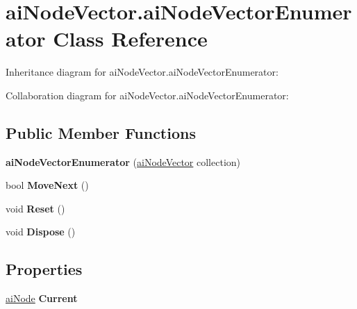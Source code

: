 \hypertarget{classai_node_vector_1_1ai_node_vector_enumerator}{\section{ai\+Node\+Vector.\+ai\+Node\+Vector\+Enumerator Class Reference}
\label{classai_node_vector_1_1ai_node_vector_enumerator}
}


Inheritance diagram for ai\+Node\+Vector.\+ai\+Node\+Vector\+Enumerator\+:


Collaboration diagram for ai\+Node\+Vector.\+ai\+Node\+Vector\+Enumerator\+:
\subsection*{Public Member Functions}
\begin{DoxyCompactItemize}
\item 
\hypertarget{classai_node_vector_1_1ai_node_vector_enumerator_acde1673f7765d7af798bef6e0896935c}{{\bfseries ai\+Node\+Vector\+Enumerator} (\hyperlink{classai_node_vector}{ai\+Node\+Vector} collection)}\label{classai_node_vector_1_1ai_node_vector_enumerator_acde1673f7765d7af798bef6e0896935c}

\item 
\hypertarget{classai_node_vector_1_1ai_node_vector_enumerator_a7d8b08661e2b325cf68f78ffb8c25141}{bool {\bfseries Move\+Next} ()}\label{classai_node_vector_1_1ai_node_vector_enumerator_a7d8b08661e2b325cf68f78ffb8c25141}

\item 
\hypertarget{classai_node_vector_1_1ai_node_vector_enumerator_a93cae2c1ff3a182390394ede84efd44d}{void {\bfseries Reset} ()}\label{classai_node_vector_1_1ai_node_vector_enumerator_a93cae2c1ff3a182390394ede84efd44d}

\item 
\hypertarget{classai_node_vector_1_1ai_node_vector_enumerator_a56f6e96f17b6e123881d356b0f163961}{void {\bfseries Dispose} ()}\label{classai_node_vector_1_1ai_node_vector_enumerator_a56f6e96f17b6e123881d356b0f163961}

\end{DoxyCompactItemize}
\subsection*{Properties}
\begin{DoxyCompactItemize}
\item 
\hypertarget{classai_node_vector_1_1ai_node_vector_enumerator_a4524e62db15f8d3f74cf8c54ece5de19}{\hyperlink{structai_node}{ai\+Node} {\bfseries Current}}\label{classai_node_vector_1_1ai_node_vector_enumerator_a4524e62db15f8d3f74cf8c54ece5de19}

\end{DoxyCompactItemize}


